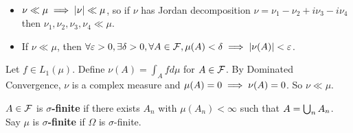 \documentclass{article}
\begin{document}
\begin{rmks}~
  \begin{itemize}
    \item $\nu \ll \mu \implies \left\lvert \nu\right\rvert \ll \mu$, so if $\nu$ has Jordan decomposition $\nu = \nu_1 - \nu_2 + i\nu_3 - i\nu_4$ then $\nu_1, \nu_2, \nu_3, \nu_4 \ll \mu$.
    \item If $\nu \ll \mu$, then $\forall \varepsilon > 0, \exists \delta > 0, \forall A \in \mathcal F, \mu(A) < \delta \implies \left\lvert \nu(A)\right\rvert < \varepsilon$.
  \end{itemize}
\end{rmks}

\begin{eg}
  Let $f \in L_1(\mu)$. Define $\nu(A) = \int_A f d\mu$ for $A \in \mathcal F$. By Dominated Convergence, $\nu$ is a complex measure and $\mu(A) = 0 \implies \nu(A) = 0$. So $\nu \ll \mu$.
\end{eg}

\begin{defi}
  $A \in \mathcal F$ is {\bf $\sigma$-finite} if there exists $A_n$ with $\mu(A_n) < \infty$ such that $A = \bigcup_n A_n$. Say $\mu$ is {\bf $\sigma$-finite} if $\Omega$ is $\sigma$-finite.
\end{defi}
\end{document}
